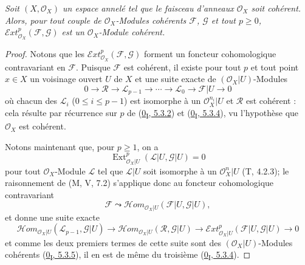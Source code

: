 \begin{proposition}[12.3.3]
\label{0.12.3.3-fr}
\emph{Soit $(X,\mathcal O_X)$ un espace annelé tel que le faisceau d'anneaux
$\mathcal O_X$ soit cohérent. Alors, pour tout couple de
$\mathcal O_X$-Modules cohérents $\mathcal F$, $\mathcal G$ et tout
$p\geq0$, $\mathcal{E}xt_{\mathcal O_X}^p(\mathcal F,\mathcal G)$ est un
$\mathcal O_X$-Module cohérent.}
\end{proposition}

\begin{proof}
Notons que les $\mathcal{E}xt_{\mathcal O_X}^p(\mathcal F,\mathcal G)$
forment un foncteur cohomologique contravariant en $\mathcal F$. Puisque
$\mathcal F$ est cohérent, il existe pour tout $p$ et tout point $x\in X$ un
voisinage ouvert $U$ de $X$ et une suite exacte de
$(\mathcal O_X|U)$-Modules
\[
0\longrightarrow\mathcal R\longrightarrow\mathcal L_{p-1}
\longrightarrow\cdots\longrightarrow\mathcal L_0
\longrightarrow\mathcal F|U\longrightarrow0
\]
où chacun des $\mathcal L_i$ ($0\leq i\leq p-1$) est isomorphe à un
$\mathcal O_X^{n_i}|U$ et $\mathcal R$ est cohérent : cela résulte par
récurrence sur $p$ de (\hyperref[0.5.3.2-fr]{0\textsubscript{I}, 5.3.2}) et
(\hyperref[0.5.3.4-fr]{0\textsubscript{I}, 5.3.4}), vu l'hypothèse que
$\mathcal O_X$ est cohérent.

Notons maintenant que, pour $p\geq1$, on a
\[
\operatorname{Ext}_{\mathcal O_X|U}^p(\mathcal L|U,\mathcal G|U)=0
\]
pour tout $\mathcal O_X$-Module $\mathcal L$ tel que $\mathcal L|U$ soit
isomorphe à un $\mathcal O_X^n|U$ (T, 4.2.3); le raisonnement de (M, V, 7.2)
s'applique donc au foncteur cohomologique contravariant
\[
\mathcal F\leadsto
\mathcal{H}om_{\mathcal O_X|U}(\mathcal F|U,\mathcal G|U),
\]
et donne une suite exacte
\[
\mathcal{H}om_{\mathcal O_X|U}(\mathcal L_{p-1},\mathcal G|U)
\longrightarrow
\mathcal{H}om_{\mathcal O_X|U}(\mathcal R,\mathcal G|U)
\longrightarrow
\mathcal{E}xt_{\mathcal O_X|U}^p(\mathcal F|U,\mathcal G|U)
\longrightarrow0
\]
et comme les deux premiers termes de cette suite sont des
$(\mathcal O_X|U)$-Modules cohérents
(\hyperref[0.5.3.5-fr]{0\textsubscript{I}, 5.3.5}), il en est de même du
troisième (\hyperref[0.5.3.4-fr]{0\textsubscript{I}, 5.3.4}).
\end{proof}


